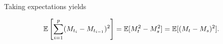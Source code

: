 \documentclass[../Main.tex]{subfiles}
\begin{document}
Taking expectations yields

\begin{equation}
\mathbb{E}\left[
\sum_{i=1}^{p}(M_{t_i}-M_{t_{i-1}})^2
\right]
=
\mathbb{E}[M_t^2-M_s^2]
=
\mathbb{E}[(M_t-M_s)^2].
\label{eq:martingale_increment_identity_continuous_expectation}
\end{equation}








\end{document}
